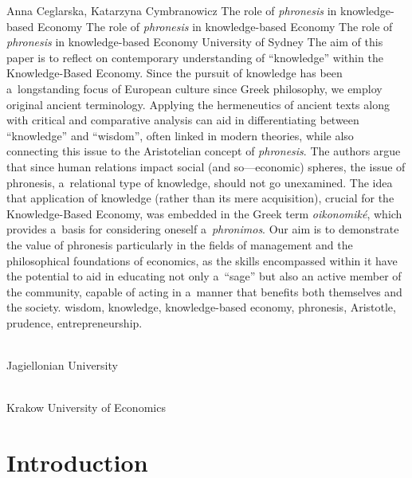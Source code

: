 \begin{artengenv2auth}{Anna Ceglarska, Katarzyna Cymbranowicz}
	{The role of \textit{phronesis} in knowledge-based Economy}
		{The role of \textit{phronesis} in knowledge-based Economy}
		{The role of \textit{phronesis} in knowledge-based Economy}
	{University of Sydney}
	{The aim of this paper is to reflect on contemporary understanding of ``knowledge'' within the Knowledge-Based Economy. Since the pursuit of knowledge has been a~longstanding focus of European culture since Greek philosophy, we employ original ancient terminology. Applying the hermeneutics of ancient texts along with critical and comparative analysis can aid in differentiating between ``knowledge'' and ``wisdom'', often linked in modern theories, while also connecting this issue to the Aristotelian concept of \textit{phronesis}. The authors argue that since human relations impact social (and so---economic) spheres, the issue of phronesis, a~relational type of knowledge, should not go unexamined. The idea that application of knowledge (rather than its mere acquisition), crucial for the Knowledge-Based Economy, was embedded in the Greek term \textit{oikonomiké}, which provides a~basis for considering oneself a~\textit{phronimos}. Our aim is to demonstrate the value of phronesis particularly in the fields of management and the philosophical foundations of economics, as the skills encompassed within it have the potential to aid in educating not only a~``sage'' but also an active member of the community, capable of acting in a~manner that benefits both themselves and the society.
		}
		{wisdom, knowledge, knowledge-based economy, phronesis, Aristotle, prudence, entrepreneurship.}
	{%
		{\flushright{}\\\subsubsectit\small{Jagiellonian University}\par}%
		{\flushright{}\\\subsubsectit\small{Krakow University of Economics}\par}%
	}




\section{Introduction}


\end{artengenv2auth}
